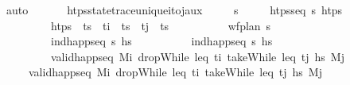 \begin{isabellebody}
\ auto\isanewline
\ \ \isamarkupfalse%
%
\endisatagproof
{\isafoldproof}%
%
\isadelimproof
\isanewline
%
\endisadelimproof
\isanewline
\isanewline
\ \ \isamarkupfalse%
\ htps{\isacharunderscore}{\kern0pt}state{\isacharunderscore}{\kern0pt}trace{\isacharunderscore}{\kern0pt}unique{\isacharunderscore}{\kern0pt}i{\isacharunderscore}{\kern0pt}to{\isacharunderscore}{\kern0pt}j{\isacharunderscore}{\kern0pt}aux{\isacharcolon}{\kern0pt}\isanewline
\ \ \ \ \ {\isasympi}s\isanewline
\ \ \ \ \ {\isachardoublequoteopen}htps{\isacharunderscore}{\kern0pt}seq\ {\isasympi}s\ htps{\isachardoublequoteclose}\ \isanewline
\ \ \ \ \ \ \ \ \ {\isachardoublequoteopen}htps\ {\isacharequal}{\kern0pt}\ ts\ {\isacharat}{\kern0pt}\ t\isactrlsub i\ {\isacharhash}{\kern0pt}\ ts\ {\isacharat}{\kern0pt}\ t\isactrlsub j\ {\isacharhash}{\kern0pt}\ ts\ \isanewline
\ \ \ \ \ \ \ \ \ {\isachardoublequoteopen}wf{\isacharunderscore}{\kern0pt}plan\ {\isasympi}s{\isachardoublequoteclose}\isanewline
\ \ \ \ \ \ \ \ \ {\isachardoublequoteopen}ind{\isacharunderscore}{\kern0pt}happ{\isacharunderscore}{\kern0pt}seq\ {\isasympi}s\ hs\ \isanewline
\ \ \ \ \ \ \ \ \ {\isachardoublequoteopen}ind{\isacharunderscore}{\kern0pt}happ{\isacharunderscore}{\kern0pt}seq\ {\isasympi}s\ hs\ \isanewline
\ \ \ \ \ \ \ \ \ {\isachardoublequoteopen}valid{\isacharunderscore}{\kern0pt}happ{\isacharunderscore}{\kern0pt}seq\ M\isactrlsub i\ {\isacharparenleft}{\kern0pt}dropWhile\ {\isacharparenleft}{\kern0pt}leq\ t\isactrlsub i{\isacharparenright}{\kern0pt}\ {\isacharparenleft}{\kern0pt}takeWhile\ {\isacharparenleft}{\kern0pt}leq\ t\isactrlsub j{\isacharparenright}{\kern0pt}\ hs\ M\isactrlsub j{\isachardoublequoteclose}\isanewline
\ \ \ \ \ {\isachardoublequoteopen}valid{\isacharunderscore}{\kern0pt}happ{\isacharunderscore}{\kern0pt}seq\ M\isactrlsub i\ {\isacharparenleft}{\kern0pt}dropWhile\ {\isacharparenleft}{\kern0pt}leq\ t\isactrlsub i{\isacharparenright}{\kern0pt}\ {\isacharparenleft}{\kern0pt}takeWhile\ {\isacharparenleft}{\kern0pt}leq\ t\isactrlsub j{\isacharparenright}{\kern0pt}\ hs\ M\isactrlsub j{\isachardoublequoteclose}\isanewline

\end{isabellebody}
